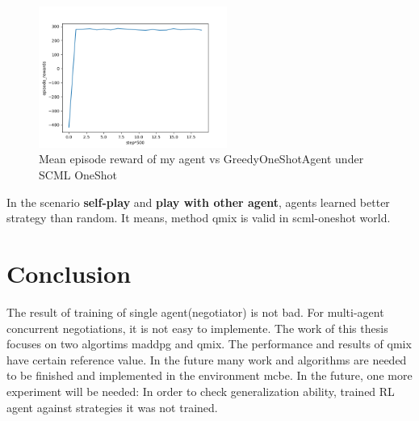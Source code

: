 \begin{figure}[htbp]
\centering
\includegraphics[width=0.55\textwidth]{./images/oneshot_my_vs_greedy.png}
\caption{Mean episode reward of my agent vs GreedyOneShotAgent under SCML OneShot}
\label{fig:oneshot-my-vs-greedy}
\end{figure}

In the scenario \textbf{self-play} and \textbf{play with other agent}, agents learned better strategy than random. It means, method \gls{qmix} is valid in scml-oneshot world.

\section{Conclusion}
The result of training of single agent(negotiator) is not bad. For multi-agent concurrent negotiations, it is not easy to implemente. The work of this thesis focuses on two algortims \gls{maddpg} and \gls{qmix}. The performance and results of \gls{qmix} have certain reference value. In the future many work and algorithms are needed to be finished and implemented in the environment \gls{mcbe}. In the future, one more experiment will be needed: In order to check generalization ability, trained RL agent against strategies it was not trained.